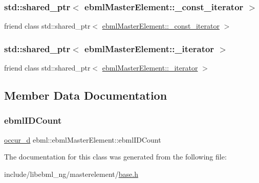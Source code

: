 \subsubsection{\texorpdfstring{std\+::shared\+\_\+ptr$<$ ebml\+Master\+Element\+::\+\_\+const\+\_\+iterator $>$}{std::shared\_ptr< ebmlMasterElement::\_const\_iterator >}}
{\footnotesize\ttfamily friend class std\+::shared\+\_\+ptr$<$ \mbox{\hyperlink{classebml_1_1ebmlMasterElement_1_1__const__iterator}{ebml\+Master\+Element\+::\+\_\+const\+\_\+iterator}} $>$\hspace{0.3cm}{\ttfamily [friend]}}

\mbox{\label{classebml_1_1ebmlMasterElement_acc1799ddfada4f75c065e88d8c176bb5}} 
\subsubsection{\texorpdfstring{std\+::shared\+\_\+ptr$<$ ebml\+Master\+Element\+::\+\_\+iterator $>$}{std::shared\_ptr< ebmlMasterElement::\_iterator >}}
{\footnotesize\ttfamily friend class std\+::shared\+\_\+ptr$<$ \mbox{\hyperlink{classebml_1_1ebmlMasterElement_1_1__iterator}{ebml\+Master\+Element\+::\+\_\+iterator}} $>$\hspace{0.3cm}{\ttfamily [friend]}}



\subsection{Member Data Documentation}
\mbox{\label{classebml_1_1ebmlMasterElement_a1d98e7686af827ef3bc4017a93c998af}} 
\subsubsection{\texorpdfstring{ebml\+I\+D\+Count}{ebmlIDCount}}
{\footnotesize\ttfamily \mbox{\hyperlink{namespaceebml_a4ecb956f78f49ef5e24e0d0db9b646f4}{occur\+\_\+d}} ebml\+::ebml\+Master\+Element\+::ebml\+I\+D\+Count\hspace{0.3cm}{\ttfamily [protected]}}



The documentation for this class was generated from the following file\+:\begin{DoxyCompactItemize}
\item 
include/libebml\+\_\+ng/masterelement/\mbox{\hyperlink{masterelement_2base_8h}{base.\+h}}\end{DoxyCompactItemize}
